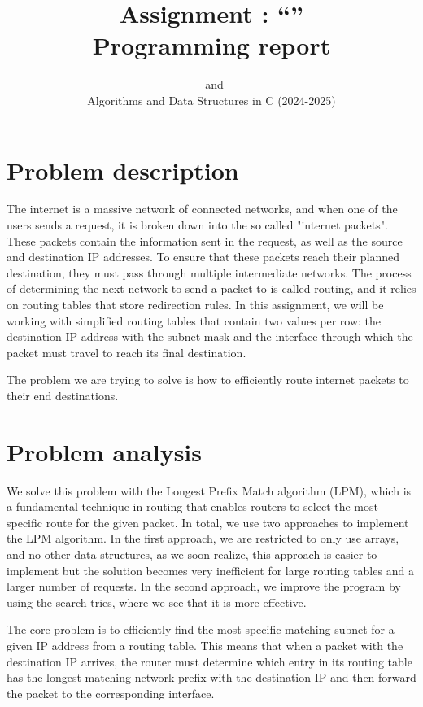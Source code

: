 \documentclass{lpm/adsrprt}
\title{Assignment \assgnnum: ``\assgntitle''\\Programming report}
\subtitle{\snumA\ and \snumB\\Algorithms and Data Structures in C (2024-2025)}
\begin{document}
\maketitle


\section{Problem description}

The internet is a massive network of connected networks, and when one of the users sends a request, it is broken down into the so called "internet packets". These packets contain the information sent in the request, as well as the source and destination IP addresses. To ensure that these packets reach their planned destination, they must pass through multiple intermediate networks. The process of determining the next network to send a packet to is called routing, and it relies on routing tables that store redirection rules. In this assignment, we will be working with simplified routing tables that contain two values per row: the destination IP address with the subnet mask and the interface through which the packet must travel to reach its final destination.

The problem we are trying to solve is how to efficiently route internet packets to their end destinations.


\section{Problem analysis}

We solve this problem with the Longest Prefix Match algorithm (LPM), which is a fundamental technique in routing that enables routers to select the most specific route for the given packet. In total, we use two approaches to implement the LPM algorithm. In the first approach, we are restricted to only use arrays, and no other data structures, as we soon realize, this approach is easier to implement but the solution becomes very inefficient for large routing tables and a larger number of requests. In the second approach, we improve the program by using the search tries, where we see that it is more effective.


The core problem is to efficiently find the most specific matching subnet for a given IP address from a routing table. This means that when a packet with the destination IP arrives, the router must determine which entry in its routing table has the longest matching network prefix with the destination IP and then forward the packet to the corresponding interface.
\end{document}
